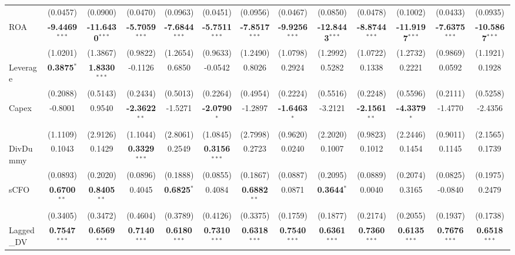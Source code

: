 \begin{landscape}
\begin{table}[H]
\begin{tabular}{lcccccccccccc}
 & (0.0457) & (0.0900) & (0.0470) & (0.0963) & (0.0451) & (0.0956) & (0.0467) & (0.0850) & (0.0478) & (0.1002) & (0.0433) & (0.0935) \\
ROA & \textbf{-9.4469}$^{***}$ & \textbf{-11.6430}$^{***}$ & \textbf{-5.7059}$^{***}$ & \textbf{-7.6844}$^{***}$ & \textbf{-5.7511}$^{***}$ & \textbf{-7.8517}$^{***}$ & \textbf{-9.9256}$^{***}$ & \textbf{-12.8443}$^{***}$ & \textbf{-8.8744}$^{***}$ & \textbf{-11.9197}$^{***}$ & \textbf{-7.6375}$^{***}$ & \textbf{-10.5867}$^{***}$ \\
 & (1.0201) & (1.3867) & (0.9822) & (1.2654) & (0.9633) & (1.2490) & (1.0798) & (1.2992) & (1.0722) & (1.2732) & (0.9869) & (1.1921) \\
Leverage & \textbf{0.3875}$^{*}$ & \textbf{1.8330}$^{***}$ & -0.1126 & 0.6850 & -0.0542 & 0.8026 & 0.2924 & 0.5282 & 0.1338 & 0.2221 & 0.0592 & 0.1928 \\
 & (0.2088) & (0.5143) & (0.2434) & (0.5013) & (0.2264) & (0.4954) & (0.2224) & (0.5516) & (0.2248) & (0.5596) & (0.2111) & (0.5258) \\
Capex & -0.8001 & 0.9540 & \textbf{-2.3622}$^{**}$ & -1.5271 & \textbf{-2.0790}$^{*}$ & -1.2897 & \textbf{-1.6463}$^{*}$ & -3.2121 & \textbf{-2.1561}$^{**}$ & \textbf{-4.3379}$^{*}$ & -1.4770 & -2.4356 \\
 & (1.1109) & (2.9126) & (1.1044) & (2.8061) & (1.0845) & (2.7998) & (0.9620) & (2.2020) & (0.9823) & (2.2446) & (0.9011) & (2.1565) \\
DivDummy & 0.1043 & 0.1429 & \textbf{0.3329}$^{***}$ & 0.2549 & \textbf{0.3156}$^{***}$ & 0.2723 & 0.0240 & 0.1007 & 0.1012 & 0.1454 & 0.1145 & 0.1739 \\
 & (0.0893) & (0.2020) & (0.0896) & (0.1888) & (0.0855) & (0.1867) & (0.0887) & (0.2095) & (0.0889) & (0.2074) & (0.0825) & (0.1975) \\
sCFO & \textbf{0.6700}$^{**}$ & \textbf{0.8405}$^{**}$ & 0.4045 & \textbf{0.6825}$^{*}$ & 0.4084 & \textbf{0.6882}$^{**}$ & 0.0871 & \textbf{0.3644}$^{*}$ & 0.0040 & 0.3165 & -0.0840 & 0.2479 \\
 & (0.3405) & (0.3472) & (0.4604) & (0.3789) & (0.4126) & (0.3375) & (0.1759) & (0.1877) & (0.2174) & (0.2055) & (0.1937) & (0.1738) \\
Lagged\_DV & \textbf{0.7547}$^{***}$ & \textbf{0.6569}$^{***}$ & \textbf{0.7140}$^{***}$ & \textbf{0.6180}$^{***}$ & \textbf{0.7310}$^{***}$ & \textbf{0.6318}$^{***}$ & \textbf{0.7540}$^{***}$ & \textbf{0.6361}$^{***}$ & \textbf{0.7360}$^{***}$ & \textbf{0.6135}$^{***}$ & \textbf{0.7676}$^{***}$ & \textbf{0.6518}$^{***}$ \\

\end{tabular}
\end{table}
\end{landscape}
